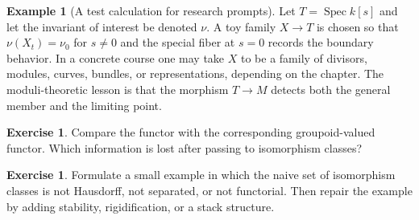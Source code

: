 \documentclass[11pt]{amsart}
\theoremstyle{definition}
\newtheorem{example}[theorem]{Example}
\newtheorem{exercise}[theorem]{Exercise}
\newcommand{\Spec}{\operatorname{Spec}}
\begin{document}
\begin{example}[A test calculation for research prompts]
Let $T=\Spec k[s]$ and let the invariant of interest be denoted $\nu$.  A toy family $X\to T$ is chosen so that $\nu(X_t)=\nu_0$ for $s\ne0$ and the special fiber at $s=0$ records the boundary behavior.  In a concrete course one may take $X$ to be a family of divisors, modules, curves, bundles, or representations, depending on the chapter.  The moduli-theoretic lesson is that the morphism $T\to M$ detects both the general member and the limiting point.
\end{example}
\begin{exercise}
Compare the functor with the corresponding groupoid-valued functor.  Which information is lost after passing to isomorphism classes?
\end{exercise}
\begin{exercise}
Formulate a small example in which the naive set of isomorphism classes is not Hausdorff, not separated, or not functorial.  Then repair the example by adding stability, rigidification, or a stack structure.
\end{exercise}
\clearpage
\end{document}
